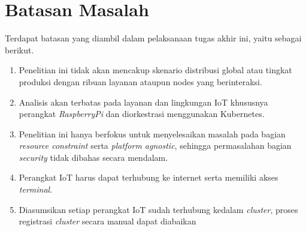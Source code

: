 \section{Batasan Masalah}
\label{sec:batasan-masalah}

Terdapat batasan yang diambil dalam pelaksanaan tugas akhir ini, yaitu sebagai berikut.

\begin{enumerate}
  \item Penelitian ini tidak akan mencakup skenario distribusi global atau tingkat produksi dengan ribuan layanan ataupun nodes yang berinteraksi.
  \item Analisis akan terbatas pada layanan dan lingkungan IoT khususnya perangkat \textit{RaspberryPi} dan diorkestrasi menggunakan Kubernetes.
  \item Penelitian ini hanya berfokus untuk menyelesaikan masalah pada bagian \textit{resource constraint} serta \textit{platform agnostic}, sehingga permasalahan bagian \textit{security} tidak dibahas secara mendalam.
  \item Perangkat IoT harus dapat terhubung ke internet serta memiliki akses \textit{terminal}.
  \item Diasumsikan setiap perangkat IoT sudah terhubung kedalam \textit{cluster}, proses registrasi \textit{cluster} secara manual dapat diabaikan
\end{enumerate}


